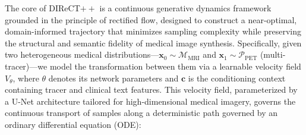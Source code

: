 The core of DIReCT$++$ is a continuous generative dynamics framework grounded in the principle of rectified flow, designed to construct a near-optimal, domain-informed trajectory that minimizes sampling complexity while preserving the structural and semantic fidelity of medical image synthesis. Specifically, given two heterogeneous medical distributions---$\mathbf{x}_0 \sim \mathcal{M}_{\text{MRI}}$ and $\mathbf{x}_1 \sim \mathcal{P}_{\text{PET}}$ (multi-tracer)---we model the transformation between them via a learnable velocity field $V_\theta$, where $\theta$ denotes its network parameters and $\mathbf{c}$ is the conditioning context containing tracer and clinical text features. This velocity field, parameterized by a U-Net architecture tailored for high-dimensional medical imagery, governs the continuous transport of samples along a deterministic path governed by an ordinary differential equation (ODE):
